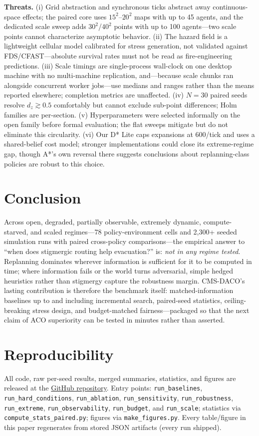 ﻿\documentclass[conference]{IEEEtran}
\begin{document}
\textbf{Threats.} (i) Grid abstraction and synchronous ticks abstract away continuous-space effects; the paired core uses $15^2$--$20^2$ maps with up to 45 agents, and the dedicated scale sweep adds $30^2$/$40^2$ points with up to 100 agents---two scale points cannot characterize asymptotic behavior. (ii) The hazard field is a lightweight cellular model calibrated for stress generation, not validated against FDS/CFAST---absolute survival rates must not be read as fire-engineering predictions. (iii) Scale timings are single-process wall-clock on one desktop machine with no multi-machine replication, and---because scale chunks ran alongside concurrent worker jobs---use medians and ranges rather than the means reported elsewhere; completion metrics are unaffected. (iv) $N{=}30$ paired seeds resolve $d_z\gtrsim0.5$ comfortably but cannot exclude sub-point differences; Holm families are per-section. (v) Hyperparameters were selected informally on the open family before formal evaluation; the flat sweeps mitigate but do not eliminate this circularity. (vi) Our D* Lite caps expansions at 600/tick and uses a shared-belief cost model; stronger implementations could close its extreme-regime gap, though A*'s own reversal there suggests conclusions about replanning-class policies are robust to this choice.

\section{Conclusion}
Across open, degraded, partially observable, extremely dynamic, compute-starved, and scaled regimes---78 policy-environment cells and 2{,}300+ seeded simulation runs with paired cross-policy comparisons---the empirical answer to ``when does stigmergic routing help evacuation?'' is: \emph{not in any regime tested}. Replanning dominates wherever information is sufficient for it to be computed in time; where information fails or the world turns adversarial, simple hedged heuristics rather than stigmergy capture the robustness margin. CMS-DACO's lasting contribution is therefore the benchmark itself: matched-information baselines up to and including incremental search, paired-seed statistics, ceiling-breaking stress design, and budget-matched fairness---packaged so that the next claim of ACO superiority can be tested in minutes rather than asserted.

\section*{Reproducibility}
All code, raw per-seed results, merged summaries, statistics, and figures are
released at the
\href{https://github.com/Sathvikar01/Fire_Evacuation_System}{GitHub repository}.
Entry points: \texttt{run\_baselines}, \texttt{run\_hard\_conditions},
\texttt{run\_ablation}, \texttt{run\_sensitivity}, \texttt{run\_robustness},
\texttt{run\_extreme}, \texttt{run\_observability}, \texttt{run\_budget},
and \texttt{run\_scale}; statistics via \texttt{compute\_stats\_paired.py}; figures via
\texttt{make\_figures.py}. Every table/figure in this paper regenerates from
stored JSON artifacts (every run shipped).
\end{document}
